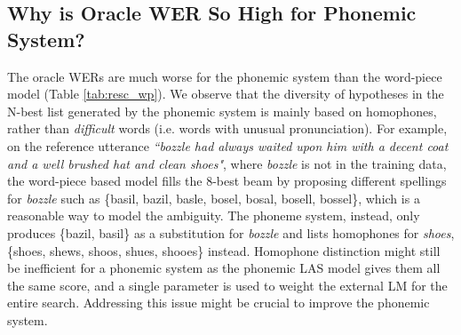 \documentclass[a4paper]{article}
\begin{document}
\subsection{Why is Oracle WER So High for Phonemic System?}
      \vspace{-1mm}
The oracle WERs are much worse for the phonemic system than the word-piece model
(Table \ref{tab:resc_wp}).
We observe that the diversity of hypotheses in the N-best list generated by the phonemic
system is mainly based on homophones, rather than \textit{difficult} words (i.e. words with unusual
pronunciation).
For example, on the reference utterance \textit{``bozzle had always waited upon
	him with a decent coat and a well brushed hat and clean shoes"}, where
\textit{bozzle} is not in the training data, the word-piece based model fills the 8-best beam
by proposing different spellings for \textit{bozzle} such as \{basil, bazil,
basle, bosel, bosal, bosell, bossel\}, which is a reasonable way to model the ambiguity.
The phoneme system, instead, only produces \{bazil, basil\} as a substitution
for \textit{bozzle} and lists homophones for \textit{shoes}, \{shoes, shews,
shoos, shues, shooes\} instead.
Homophone distinction might still be inefficient for a phonemic system as the
phonemic LAS model gives them all the same score, and a single parameter is used
to weight the external LM for the entire search. 
Addressing this issue might be crucial to improve the phonemic system.
\end{document}

